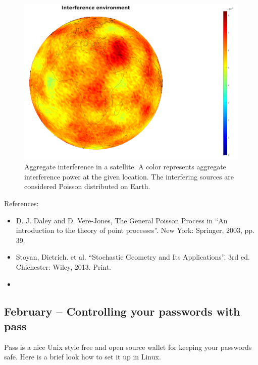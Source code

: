 \documentclass{article}
\begin{document}
\begin{figure}
  \includegraphics[width=\linewidth]{interferenceenvironment.png}
  \caption{Aggregate interference in a satellite. A color represents aggregate interference power at the given location. The interfering sources are considered Poisson distributed on Earth.}
\end{figure}

References:
\begin{itemize}
\item D. J. Daley and D. Vere-Jones, The General Poisson Process in  ``An introduction to the theory of point processes''. New York: Springer, 2003, pp. 39. 
\item Stoyan, Dietrich. et al. ``Stochastic Geometry and Its Applications''. 3rd ed. Chichester: Wiley, 2013. Print.
\item  {}
\end{itemize}




\subsection{February – Controlling your passwords with pass}
Pass is a nice Unix style free and open source wallet for keeping your passwords safe. Here is a brief look how to set it up in Linux.
\end{document}
